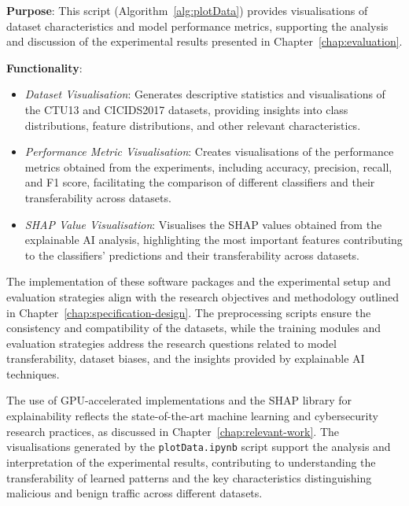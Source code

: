 \textbf{Purpose}: This script (Algorithm~\ref{alg:plotData}) provides visualisations of dataset characteristics and model performance metrics, supporting the analysis and discussion of the experimental results presented in Chapter~\ref{chap:evaluation}.

\textbf{Functionality}:

\begin{itemize}
    \item \textit{Dataset Visualisation}: Generates descriptive statistics and visualisations of the CTU13 and CICIDS2017 datasets, providing insights into class distributions, feature distributions, and other relevant characteristics.
    \item \textit{Performance Metric Visualisation}: Creates visualisations of the performance metrics obtained from the experiments, including accuracy, precision, recall, and F1 score, facilitating the comparison of different classifiers and their transferability across datasets.
    \item \textit{SHAP Value Visualisation}: Visualises the SHAP values obtained from the explainable AI analysis, highlighting the most important features contributing to the classifiers' predictions and their transferability across datasets.
\end{itemize}

The implementation of these software packages and the experimental setup and evaluation strategies align with the research objectives and methodology outlined in Chapter~\ref{chap:specification-design}. The preprocessing scripts ensure the consistency and compatibility of the datasets, while the training modules and evaluation strategies address the research questions related to model transferability, dataset biases, and the insights provided by explainable AI techniques.

The use of GPU-accelerated implementations and the SHAP library for explainability reflects the state-of-the-art machine learning and cybersecurity research practices, as discussed in Chapter~\ref{chap:relevant-work}. The visualisations generated by the \texttt{plotData.ipynb} script support the analysis and interpretation of the experimental results, contributing to understanding the transferability of learned patterns and the key characteristics distinguishing malicious and benign traffic across different datasets.